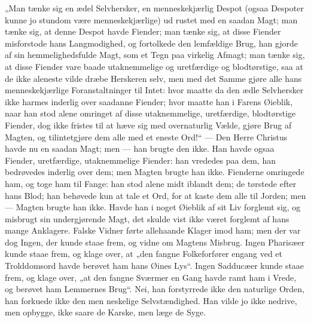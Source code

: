 \documentclass[12pt,a4paper]{book}
\begin{document}
„Man tænke sig en ædel Selvhersker, en menneskekjærlig Despot (ogsaa Despoter kunne jo
stundom være menneskekjærlige) ud\-%
rustet med en saadan Magt; man tænke sig, at denne Despot havde Fiender; man tænke sig,
at disse Fiender misforstode hans Langmodighed, og fortolkede den lemfældige Brug, han
gjorde af sin hemmelighedsfulde Magt, som et Tegn paa virkelig Afmagt; man tænke sig,
at disse Fiender vare baade utaknemmelige og uretfærdige og blodtørstige, saa at de
ikke aleneste vilde dræbe Herskeren selv, men med det Samme gjøre alle hans
menneskekjærlige Foranstaltninger til Intet: hvor maatte da den ædle Selvhersker ikke
harmes inderlig over saadanne Fiender; hvor maatte han i Farens Øieblik, naar han stod
alene omringet af disse utaknemmelige, uretfærdige, blodtørstige Fiender, dog ikke
fristes til at hæve sig med overnaturlig Vælde, gjøre Brug af Magten, og tilintetgjøre
dem alle med et eneste Ord!“ --- Den Herre Christus havde nu en saadan Magt; men ---
han brugte den ikke. Han havde ogsaa Fiender, uretfærdige, utaknemmelige Fiender: han
vrededes paa dem, han bedrøvedes inderlig over dem; men Magten brugte han ikke.
Fienderne omringede ham, og toge ham til Fange: han stod alene midt iblandt dem; de
tørstede efter hans Blod; han behøvede kun at tale et Ord, for at kaste dem alle til
Jorden; men --- Magten brugte han ikke. Havde han i noget Øieblik af sit Liv forglemt
sig, og misbrugt sin undergjørende Magt, det skulde vist ikke været forglemt af hans
mange Anklagere. Falske Vidner førte allehaande Klager imod ham; men der var dog Ingen,
der kunde staae frem, og vidne om Magtens Misbrug. Ingen Pharisæer kunde staae frem, og
klage over, at „den fangne Folkeforfører engang ved et Trolddomsord havde berøvet ham
hans Øines Lys“. Ingen Sadducæer kunde staae frem, og klage over, „at den fangne
Sværmer en Gang havde ramt ham i Vrede, og berøvet ham Lemmernes Brug“. Nei, han
forstyrrede ikke den naturlige Orden, han forkuede ikke den men\-%
neskelige Selvstændighed. Han vilde jo ikke nedrive, men opbygge, ikke saare de Karske,
men læge de Syge.
\end{document}

